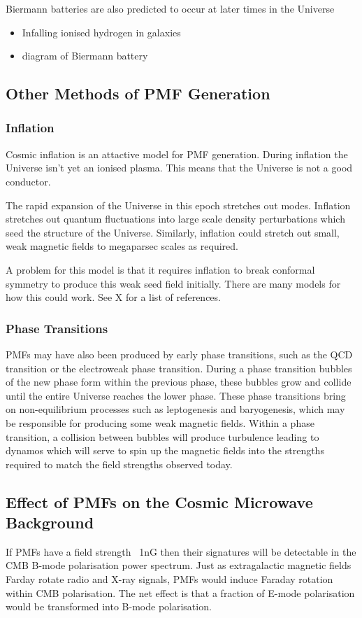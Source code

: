 Biermann batteries are also predicted to occur at later times in the Universe

\begin{itemize}
\item Infalling ionised hydrogen in galaxies
\item diagram of Biermann battery
\end{itemize}

\subsection{Other Methods of PMF Generation}

\subsubsection*{Inflation}
Cosmic inflation is an attactive model for PMF generation. During inflation the Universe isn't yet an ionised plasma. This means that the Universe is not a good conductor.

The rapid expansion of the Universe in this epoch stretches out modes. Inflation stretches out quantum fluctuations into large scale density perturbations which seed the structure of the Universe. Similarly, inflation could stretch out small, weak magnetic fields to megaparsec scales as required.

A problem for this model is that it requires inflation to break conformal symmetry to produce this weak seed field initially. There are many models for how this could work. See X for a list of references.
\subsubsection*{Phase Transitions}
PMFs may have also been produced by early phase transitions, such as the QCD transition or the electroweak phase transition. During a phase transition bubbles of the new phase form within the previous phase, these bubbles grow and collide until the entire Universe reaches the lower phase. These phase transitions bring on non-equilibrium processes such as leptogenesis and baryogenesis, which may be responsible for producing some weak magnetic fields. Within a phase transition, a collision between bubbles will produce turbulence leading to dynamos which will serve to spin up the magnetic fields into the strengths required to match the field strengths observed today.

\subsection{Effect of PMFs on the Cosmic Microwave Background}
If PMFs have a field strength ~1nG then their signatures will be detectable in the CMB B-mode polarisation power spectrum. Just as extragalactic magnetic fields Farday rotate radio and X-ray signals, PMFs would induce Faraday rotation within CMB polarisation. The net effect is that a fraction of E-mode polarisation would be transformed into B-mode polarisation.

